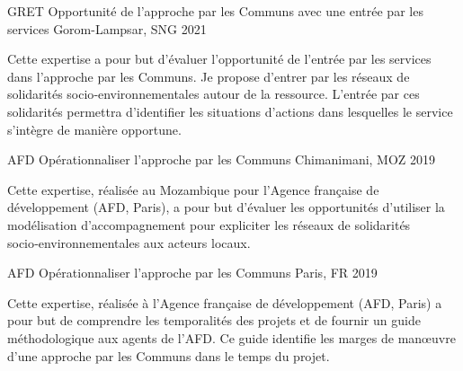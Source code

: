 

\begin{cventries}

  \cventry
    {GRET} %
    {Opportunité de l’approche par les Communs avec une entrée par les services} %
    {Gorom-Lampsar, SNG} %
    {2021} %
    {
      \begin{cvitems} %
        Cette expertise a pour but d’évaluer l’opportunité de l’entrée par les services dans l’approche par les Communs. Je propose d’entrer par les réseaux de solidarités socio‑environnementales autour de la ressource. L’entrée par ces solidarités permettra d’identifier les situations d’actions dans lesquelles le service s’intègre de manière opportune.
      \end{cvitems}
    }

    \cventry
      {AFD} %
      {Opérationnaliser l’approche par les Communs} %
      {Chimanimani, MOZ} %
      {2019} %
      {
        \begin{cvitems} %
          Cette expertise, réalisée au Mozambique pour l'Agence française de développement (AFD, Paris), a pour but d'évaluer les opportunités d’utiliser la modélisation d’accompagnement pour expliciter les réseaux de solidarités socio‑environnementales aux acteurs locaux.
        \end{cvitems}
      }

  \cventry
    {AFD} %
    {Opérationnaliser l’approche par les Communs} %
    {Paris, FR} %
    {2019} %
    {
      \begin{cvitems} %
        Cette expertise, réalisée à l’Agence française de développement (AFD, Paris) a pour but de comprendre les temporalités des projets et de fournir un guide méthodologique aux agents de l’AFD. Ce guide identifie les marges de manœuvre d’une approche par les Communs dans le temps du projet.
      \end{cvitems}
    }

\end{cventries}
